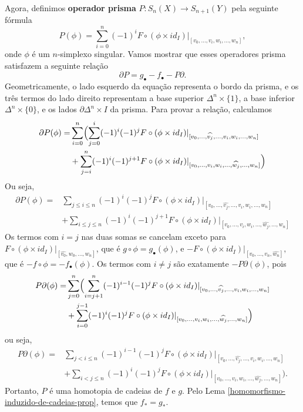 \begin{dem}
    Agora, definimos \textbf{operador prisma} $P:S_n(X)\rightarrow S_{n+1}(Y)$ pela seguinte fórmula 
    \[P(\phi)=\sum_{i=0}^n (-1)^i F\circ (\phi\times id_I)|_{[v_0,...,v_i,w_i,...,w_n]},\]
    onde $\phi$ é um $n$-simplexo singular. Vamos mostrar que esses operadores prisma satisfazem a seguinte relação 
    \[\partial P=g_\bullet-f_\bullet-P\partial.\]
    Geometricamente, o lado esquerdo da equação representa o bordo da prisma, e os três termos do lado direito representam a base superior $\Delta^n\times \{1\}$, a base inferior $\Delta^n\times\{0\}$, e os lados $\partial \Delta^n\times I$ da prisma. Para provar a relação, calculamos 
    \begin{align*}
        \partial P(\phi)=&\sum_{i=0}^{n} \Bigl(\sum_{j=0}^{i} (-1)^i(-1)^j F\circ (\phi\times id_I)|_{[v_0,...,\widehat{v_j},...,v_i, w_i,...,w_n]} \\
        &+ \sum_{j=i}^{n} (-1)^i(-1)^{j+1} F\circ (\phi\times id_I)|_{[v_0,...,v_i,w_i,...,\widehat{w_j},...,w_n]}\Bigr)
    \end{align*}
    Ou seja, 
    \begin{align*}
        \partial P(\phi)=&\sum_{j\le i\le n} (-1)^i(-1)^j F\circ (\phi\times id_I)|_{[v_0,...,\widehat{v_j},...,v_i, w_i,...,w_n]} \\
        &+ \sum_{i\le j\le n} (-1)^i(-1)^{j+1} F\circ (\phi\times id_I)|_{[v_0,...,v_i,w_i,...,\widehat{w_j},...,w_n]}
    \end{align*}
    Os termos com $i=j$ nas duas somas se cancelam exceto para $F\circ(\phi\times id_I)|_{[\widehat{v_0},w_0,...,w_n]}$, que é $g\circ\phi=g_\bullet (\phi)$, e $-F\circ (\phi\times id_I)|_{[v_0,...,v_n,\widehat{w_n}]},$ que é $-f\circ\phi=-f_\bullet(\phi)$. Os termos com $i\ne j$ são exatamente $-P\partial (\phi)$, pois 
    \begin{align*}
        P\partial(\phi)=&\sum_{j=0}^{n} \Bigl( \sum_{i=j+1}^{n} (-1)^{i-1}(-1)^j F\circ (\phi\times id_I)|_{[v_0,...,\widehat{v_j},...,v_i,w_i,...,w_n]}\\
        &+\sum_{i=0}^{j-1} (-1)^i(-1)^j F\circ(\phi\times id_I)|_{[v_0,...,v_i,w_i,...,\widehat{w_j},...,w_n]}\Bigr)
    \end{align*}
    ou seja,
    \begin{align*}
        P\partial(\phi)=&\sum_{j<i\le n} (-1)^{i-1}(-1)^j F\circ (\phi\times id_I)|_{[v_0,...,\widehat{v_j},...,v_i,w_i,...,w_n]}\\
        &+\sum_{i<j\le n} (-1)^i(-1)^j F\circ(\phi\times id_I)|_{[v_0,...,v_i,w_i,...,\widehat{w_j},...,w_n]}\Bigr).
    \end{align*}
    Portanto, $P$ é uma homotopia de cadeias de $f$ e $g$. Pelo Lema \ref{homomorfismo-induzido-de-cadeias-prop}, temos que $f_*=g_*$.
\end{dem}

